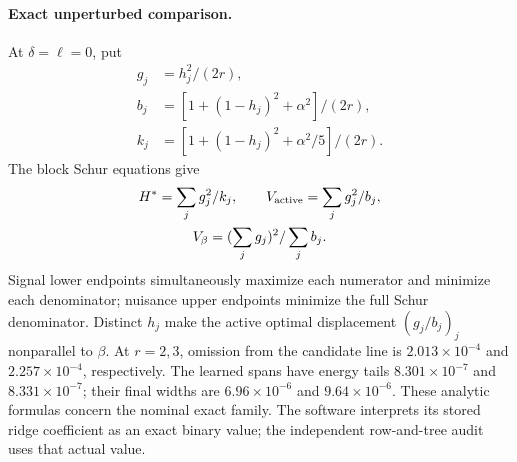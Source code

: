 \paragraph{Exact unperturbed comparison.}
At $\delta=\ell=0$, put
\begin{align*}
 g_j&=h_j^2/(2r),\\
 b_j&=[1+(1-h_j)^2+\alpha^2]/(2r),\\
 k_j&=[1+(1-h_j)^2+\alpha^2/5]/(2r).
\end{align*}
The block Schur equations give
\begin{gather*}
 H^*=\sum_jg_j^2/k_j,\qquad V_{\rm active}=\sum_jg_j^2/b_j,\\
 V_\beta=(\sum_jg_j)^2/\sum_jb_j.
\end{gather*}
Signal lower endpoints simultaneously maximize each numerator and minimize each denominator; nuisance upper endpoints minimize the full Schur denominator. Distinct $h_j$ make the active optimal displacement $(g_j/b_j)_j$ nonparallel to $\beta$. At $r=2,3$, omission from the candidate line is $2.013\times10^{-4}$ and $2.257\times10^{-4}$, respectively. The learned spans have energy tails $8.301\times10^{-7}$ and $8.331\times10^{-7}$; their final widths are $6.96\times10^{-6}$ and $9.64\times10^{-6}$. These analytic formulas concern the nominal exact family. The software interprets its stored ridge coefficient as an exact binary value; the independent row-and-tree audit uses that actual value.

